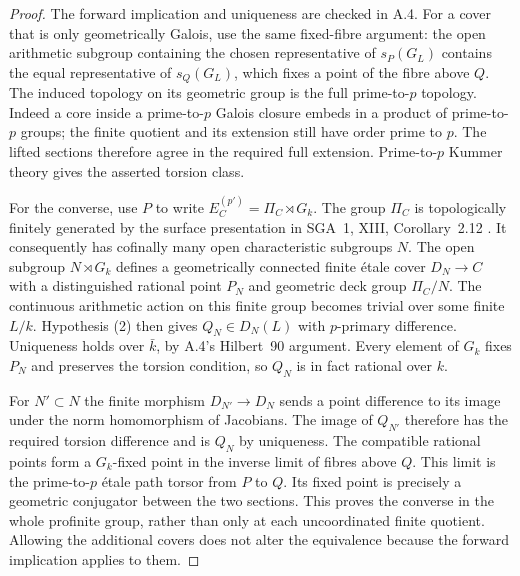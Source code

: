 \documentclass[11pt]{article}
\begin{document}
\begin{proof}
The forward implication and uniqueness are checked in A.4.  For a cover
that is only geometrically Galois, use the same fixed-fibre argument:
the open arithmetic subgroup containing the chosen representative of
$s_P(G_L)$ contains the equal representative of $s_Q(G_L)$, which fixes a
point of the fibre above $Q$.  The induced topology on its geometric
group is the full prime-to-$p$ topology.  Indeed a core inside a
prime-to-$p$ Galois closure embeds in a product of prime-to-$p$ groups;
the finite quotient and its extension still have order prime to $p$.
The lifted sections therefore agree in the required full extension.
Prime-to-$p$ Kummer theory gives the asserted torsion class.

For the converse, use $P$ to write $E_C^{(p')}=\Pi_C\rtimes G_k$.
The group $\Pi_C$ is topologically finitely generated by the surface
presentation in SGA~1, XIII, Corollary~2.12 \cite{AR_SGA1}.
It consequently has cofinally many open characteristic subgroups $N$.
The open subgroup $N\rtimes G_k$ defines a geometrically connected
finite \'etale cover $D_N\to C$ with a distinguished rational point
$P_N$ and geometric deck group $\Pi_C/N$.  The continuous arithmetic
action on this finite group becomes trivial over some finite $L/k$.
Hypothesis (2) then gives $Q_N\in D_N(L)$ with $p$-primary difference.
Uniqueness holds over $\bar k$, by A.4's Hilbert~90 argument.  Every
element of $G_k$ fixes $P_N$ and preserves the torsion condition, so
$Q_N$ is in fact rational over $k$.

For $N'\subset N$ the finite morphism $D_{N'}\to D_N$ sends a point
difference to its image under the norm homomorphism of Jacobians.  The
image of $Q_{N'}$ therefore has the required torsion difference and is
$Q_N$ by uniqueness.  The compatible rational points form a $G_k$-fixed
point in the inverse limit of fibres above $Q$.  This limit is the
prime-to-$p$ \'etale path torsor from $P$ to $Q$.  Its fixed point is
precisely a geometric conjugator between the two sections.  This proves
the converse in the whole profinite group, rather than only at each
uncoordinated finite quotient.  Allowing the additional covers does not
alter the equivalence because the forward implication applies to them.
\end{proof}
\end{document}
